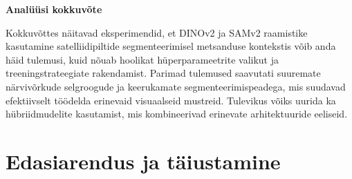 \textbf{Analüüsi kokkuvõte}

Kokkuvõttes näitavad eksperimendid, et DINOv2 ja SAMv2 raamistike kasutamine satelliidipiltide segmenteerimisel metsanduse kontekstis võib anda häid tulemusi, kuid nõuab hoolikat hüperparameetrite valikut ja treeningstrateegiate rakendamist. Parimad tulemused saavutati suuremate närvivõrkude selgroogude ja keerukamate segmenteerimispeadega, mis suudavad efektiivselt töödelda erinevaid visuaalseid mustreid. Tulevikus võiks uurida ka hübriidmudelite kasutamist, mis kombineerivad erinevate arhitektuuride eeliseid.

\section{Edasiarendus ja täiustamine}

